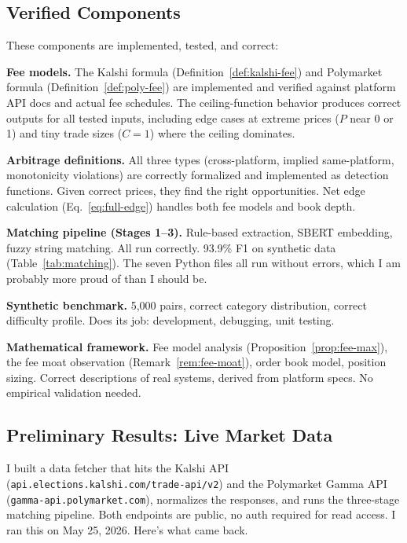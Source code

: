 \documentclass[11pt]{article}
\theoremstyle{definition}
\theoremstyle{remark}
\begin{document}
\subsection{Verified Components}
\label{sec:verified}

These components are implemented, tested, and correct:

\textbf{Fee models.} The Kalshi formula (Definition~\ref{def:kalshi-fee}) and Polymarket formula (Definition~\ref{def:poly-fee}) are implemented and verified against platform API docs and actual fee schedules. The ceiling-function behavior produces correct outputs for all tested inputs, including edge cases at extreme prices ($P$ near 0 or 1) and tiny trade sizes ($C = 1$) where the ceiling dominates.

\textbf{Arbitrage definitions.} All three types (cross-platform, implied same-platform, monotonicity violations) are correctly formalized and implemented as detection functions. Given correct prices, they find the right opportunities. Net edge calculation (Eq.~\ref{eq:full-edge}) handles both fee models and book depth.

\textbf{Matching pipeline (Stages 1--3).} Rule-based extraction, SBERT embedding, fuzzy string matching. All run correctly. 93.9\% F1 on synthetic data (Table~\ref{tab:matching}). The seven Python files all run without errors, which I am probably more proud of than I should be.

\textbf{Synthetic benchmark.} 5,000 pairs, correct category distribution, correct difficulty profile. Does its job: development, debugging, unit testing.

\textbf{Mathematical framework.} Fee model analysis (Proposition~\ref{prop:fee-max}), the fee moat observation (Remark~\ref{rem:fee-moat}), order book model, position sizing. Correct descriptions of real systems, derived from platform specs. No empirical validation needed.

\subsection{Preliminary Results: Live Market Data}
\label{sec:preliminary}

I built a data fetcher that hits the Kalshi API (\texttt{api.elections.kalshi.com/trade-api/v2}) and the Polymarket Gamma API (\texttt{gamma-api.polymarket.com}), normalizes the responses, and runs the three-stage matching pipeline. Both endpoints are public, no auth required for read access. I ran this on May 25, 2026. Here's what came back.
\end{document}
